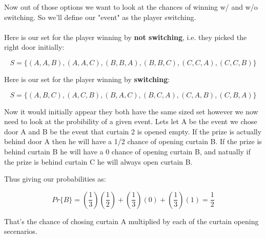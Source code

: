 \documentclass{article}
\begin{document}
\begin{enumerate}
    Now out of those options we want to look at the chances of winning w/ and w/o switching. So we'll define our "event" as the player switching. \\\\
    
    Here is our set for the player winning by \textbf{not switching}, i.e. they picked the right door initially:
    
    \[S = \{(A,A,B),(A,A,C),(B,B,A),(B,B,C),(C,C,A),(C,C,B)\}\]

    Here is our set for the player winning by \textbf{switching}:

    \[S = \{(A,B,C),(A,C,B),(B,A,C),(B,C,A),(C,A,B),(C,B,A)\}\]

    Now it would initially appear they both have the same sized set however we now need to look at the probibility of a given event. 
    Lets let A be the event we chose door A and B be the event that curtain 2 is opened empty.
    If the prize is actually behind door A then he will have a 1/2 chance of opening curtain B. If the prize is behind curtain B he will have a 0 chance of opening curtain B, and natually if the prize is behind curtain C he will always open curtain B.

    Thus giving our probabilities as:

    \[Pr\{B\} = (\frac{1}{3})(\frac{1}{2}) + (\frac{1}{3})(0) + (\frac{1}{3})(1) = \frac{1}{2}\]

    That's the chance of chosing curtain A multiplied by each of the curtain opening secenarios. 


  \end{enumerate}
\end{document}

